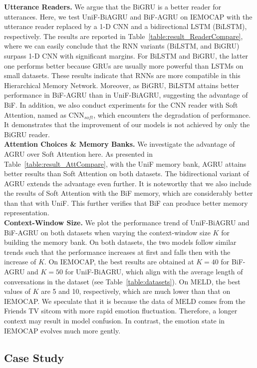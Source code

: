 \documentclass[letterpaper]{article} %
\begin{document}
\noindent\textbf{Utterance Readers.}
We argue that the BiGRU is a better reader for utterances. Here, we test UniF-BiAGRU and BiF-AGRU on IEMOCAP with the utterance reader replaced by a 1-D CNN and a bidirectional LSTM (BiLSTM), respectively. The results are reported in Table~\ref{table:result_ReaderCompare}, where we can easily conclude that the RNN variants (BiLSTM, and BiGRU) surpass 1-D CNN with significant margins. For BiLSTM and BiGRU, the latter one performs better because GRUs are usually more powerful than LSTMs on small datasets. These results indicate that RNNs are more compatible in this Hierarchical Memory Network. Moreover, as BiGRU, BiLSTM attains better performance in BiF-AGRU than in UniF-BiAGRU, suggesting the advantage of BiF. In addition, we also conduct experiments for the CNN reader with Soft Attention, named as CNN$_{soft}$, which encounters the degradation of performance. It demonstrates that the improvement of our models is not achieved by only the BiGRU reader. 
\\[1ex]
\noindent\textbf{Attention Choices \& Memory Banks.}
We investigate the advantage of AGRU over Soft Attention here. As presented in Table~\ref{table:result_AttCompare}, with the UniF memory bank, AGRU attains better results than Soft Attention on both datasets. The bidirectional variant of AGRU extends the advantage even further. It is noteworthy that we also include the results of Soft Attention with the BiF memory, which are considerably better than that with UniF. This further verifies that BiF can produce better memory representation.
\\[1ex]
\noindent\textbf{Context-Window Size.}
We plot the performance trend of UniF-BiAGRU and BiF-AGRU on both datasets when varying the context-window size $K$ for building the memory bank. On both datasets, the two models follow similar trends such that the performance increases at first and falls then with the increase of $K$. On IEMOCAP, the best results are obtained at $K=40$ for BiF-AGRU and $K=50$ for UniF-BiAGRU, which align with the average length of conversations in the dataset (see Table~\ref{table:datasets}). On MELD, the best values of $K$ are 5 and 10, respectively, which are much lower than that on IEMOCAP. We speculate that it is because the data of MELD comes from the Friends TV sitcom with more rapid emotion fluctuation. Therefore, a longer context may result in model confusion. In contrast, the emotion state in IEMOCAP evolves much more gently.


\subsection{Case Study}
\label{ssec:case_study}
\end{document}
